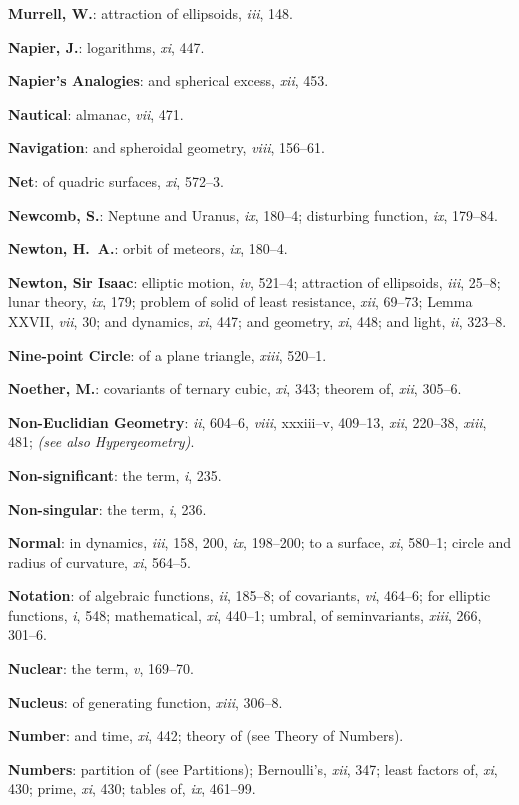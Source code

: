 \documentclass[11pt,a4paper]{article}
\newcommand{\IndexEntry}[1]{\textbf{#1}}
\newcommand{\SeeAlso}[1]{\textit{(see also #1)}}
\newcommand{\V}[1]{\textit{#1}} %
\begin{document}
\IndexEntry{Murrell, W.}: attraction of ellipsoids, \V{iii}, 148.

\IndexEntry{Napier, J.}: logarithms, \V{xi}, 447.

\IndexEntry{Napier's Analogies}: and spherical excess, \V{xii}, 453.

\IndexEntry{Nautical}: almanac, \V{vii}, 471.

\IndexEntry{Navigation}: and spheroidal geometry, \V{viii}, 156--61.

\IndexEntry{Net}: of quadric surfaces, \V{xi}, 572--3.

\IndexEntry{Newcomb, S.}: Neptune and Uranus, \V{ix}, 180--4; disturbing function, \V{ix}, 179--84.

\IndexEntry{Newton, H.\ A.}: orbit of meteors, \V{ix}, 180--4.

\IndexEntry{Newton, Sir Isaac}: elliptic motion, \V{iv}, 521--4; attraction of ellipsoids, \V{iii}, 25--8; lunar theory, \V{ix}, 179; problem of solid of least resistance, \V{xii}, 69--73; Lemma XXVII, \V{vii}, 30; and dynamics, \V{xi}, 447; and geometry, \V{xi}, 448; and light, \V{ii}, 323--8.

\IndexEntry{Nine-point Circle}: of a plane triangle, \V{xiii}, 520--1.

\IndexEntry{Noether, M.}: covariants of ternary cubic, \V{xi}, 343; theorem of, \V{xii}, 305--6.

\IndexEntry{Non-Euclidian Geometry}: \V{ii}, 604--6, \V{viii}, xxxiii--v, 409--13, \V{xii}, 220--38, \V{xiii}, 481; \SeeAlso{Hypergeometry}.

\IndexEntry{Non-significant}: the term, \V{i}, 235.

\IndexEntry{Non-singular}: the term, \V{i}, 236.

\IndexEntry{Normal}: in dynamics, \V{iii}, 158, 200, \V{ix}, 198--200; to a surface, \V{xi}, 580--1; circle and radius of curvature, \V{xi}, 564--5.

\IndexEntry{Notation}: of algebraic functions, \V{ii}, 185--8; of covariants, \V{vi}, 464--6; for elliptic functions, \V{i}, 548; mathematical, \V{xi}, 440--1; umbral, of seminvariants, \V{xiii}, 266, 301--6.

\IndexEntry{Nuclear}: the term, \V{v}, 169--70.

\IndexEntry{Nucleus}: of generating function, \V{xiii}, 306--8.

\IndexEntry{Number}: and time, \V{xi}, 442; theory of (see Theory of Numbers).

\IndexEntry{Numbers}: partition of (see Partitions); Bernoulli's, \V{xii}, 347; least factors of, \V{xi}, 430; prime, \V{xi}, 430; tables of, \V{ix}, 461--99.
\end{document}
